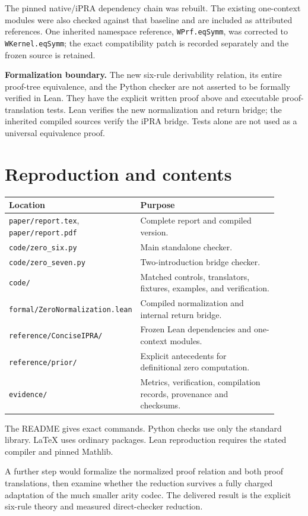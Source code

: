 \documentclass[11pt]{article}
\newcommand{\code}[1]{\nolinkurl{#1}}
\begin{document}
The pinned native/iPRA dependency chain was rebuilt. The existing
one-context modules were also checked against that baseline and are
included as attributed references. One inherited namespace reference,
\code{WPrf.eqSymm}, was corrected to \code{WKernel.eqSymm}; the exact
compatibility patch is recorded separately and the frozen source is retained.

\textbf{Formalization boundary.}
The new six-rule derivability relation, its entire proof-tree
equivalence, and the Python checker are not asserted to be formally
verified in Lean. They have the explicit written proof above and
executable proof-translation tests. Lean verifies the new normalization
and return bridge; the inherited compiled sources verify the iPRA
bridge. Tests alone are not used as a universal equivalence proof.

\section{Reproduction and contents}
\begin{center}
\begin{tabular}{p{0.32\linewidth}p{0.58\linewidth}}
\toprule
Location&Purpose\\\midrule
\code{paper/report.tex}, \code{paper/report.pdf}
 & Complete report and compiled version.\\
\code{code/zero_six.py}
 & Main standalone checker.\\
\code{code/zero_seven.py}
 & Two-introduction bridge checker.\\
\code{code/}
 & Matched controls, translators, fixtures, examples, and verification.\\
\code{formal/ZeroNormalization.lean}
 & Compiled normalization and internal return bridge.\\
\code{reference/ConciseIPRA/}
 & Frozen Lean dependencies and one-context modules.\\
\code{reference/prior/}
 & Explicit antecedents for definitional zero computation.\\
\code{evidence/}
 & Metrics, verification, compilation records, provenance and checksums.\\
\bottomrule
\end{tabular}
\end{center}
The README gives exact commands. Python checks use only the standard
library. LaTeX uses ordinary packages. Lean reproduction requires
the stated compiler and pinned Mathlib.

A further step would formalize the normalized proof relation and
both proof translations, then examine whether the reduction survives
a fully charged adaptation of the much smaller arity codec.
The delivered result is the explicit six-rule theory and measured
direct-checker reduction.
\end{document}
